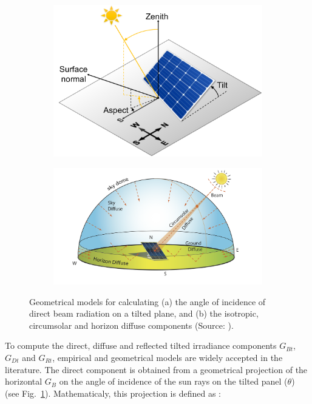 \begin{figure}[htb]
\centering
\begin{subfigure}[t]{.43\textwidth}
  \centering
  \includegraphics[width=\linewidth]{images/Figs/poa.pdf}  
    \subcaption{}
  \label{figa:solar_geom}
\end{subfigure}
\begin{subfigure}[t]{.53\textwidth}
  \centering
  \includegraphics[width=\linewidth]{images/Figs/diffuse_components.png}  
    \subcaption{}
  \label{figb:solar_geom}
\end{subfigure}
\caption{Geometrical models for calculating (a) the angle of incidence of direct beam radiation on a tilted plane, and (b) the isotropic, circumsolar and horizon diffuse components (Source: \citet{brownson_44_nodate}).}
\label{fig:solar_geom}
\end{figure}

To compute the direct, diffuse and reflected tilted irradiance components $G_{Bt}$, $G_{Dt}$ and $G_{Rt}$, empirical and geometrical models are widely accepted in the literature. 
The direct component is obtained from a geometrical projection of the horizontal $G_B$ on the angle of incidence of the sun rays on the tilted panel ($\theta$) (see Fig.~\ref{figa:solar_geom}). Mathematicaly, this projection is defined as \cite{gulin_estimation_2013}:

